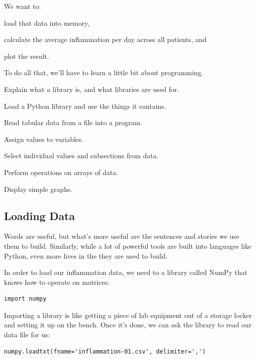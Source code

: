 \documentclass{book}
\begin{document}
We want to:

\begin{swcitemize}
\item
  load that data into memory,
\item
  calculate the average inflammation per day across all patients, and
\item
  plot the result.
\end{swcitemize}

To do all that, we'll have to learn a little bit about programming.

\begin{objectives}
\begin{swcitemize}
\item
  Explain what a library is, and what libraries are used for.
\item
  Load a Python library and use the things it contains.
\item
  Read tabular data from a file into a program.
\item
  Assign values to variables.
\item
  Select individual values and subsections from data.
\item
  Perform operations on arrays of data.
\item
  Display simple graphs.
\end{swcitemize}
\end{objectives}

\subsection{Loading Data}

Words are useful, but what's more useful are the sentences and stories
we use them to build. Similarly, while a lot of powerful tools are built
into languages like Python, even more lives in the
 they are used to build.

In order to load our inflammation data, we need to
 a library called NumPy that knows how to
operate on matrices:

\begin{verbatim}
import numpy
\end{verbatim}

Importing a library is like getting a piece of lab equipment out of a
storage locker and setting it up on the bench. Once it's done, we can
ask the library to read our data file for us:

\begin{verbatim}
numpy.loadtxt(fname='inflammation-01.csv', delimiter=',')
\end{verbatim}
\end{document}
